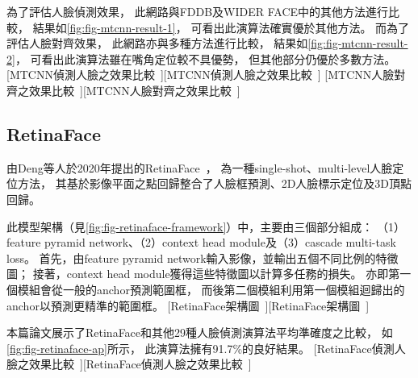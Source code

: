 \documentclass[class=NCU_thesis, crop=false]{standalone}
\begin{document}
為了評估人臉偵測效果，
此網路與FDDB及WIDER FACE中的其他方法進行比較，
結果如\cref{fig:fig-mtcnn-result-1}，
可看出此演算法確實優於其他方法。
而為了評估人臉對齊效果，
此網路亦與多種方法進行比較，
結果如\cref{fig:fig-mtcnn-result-2}，
可看出此演算法雖在嘴角定位較不具優勢，
但其他部分仍優於多數方法。
[MTCNN偵測人臉之效果比較~\cite{zhang_joint_2016}][MTCNN偵測人臉之效果比較~\cite{zhang_joint_2016}]
[MTCNN人臉對齊之效果比較~\cite{zhang_joint_2016}][MTCNN人臉對齊之效果比較~\cite{zhang_joint_2016}]

\subsection{RetinaFace}
由Deng等人於2020年提出的RetinaFace~\cite{deng_retinaface_2020}，
為一種single-shot、multi-level人臉定位方法，
其基於影像平面之點回歸整合了人臉框預測、2D人臉標示定位及3D頂點回歸。

此模型架構（見\cref{fig:fig-retinaface-framework}）中，主要由三個部分組成：
（1）feature pyramid network、（2）context head module及（3）cascade multi-task loss。
首先，由feature pyramid network輸入影像，並輸出五個不同比例的特徵圖；
接著，context head module獲得這些特徵圖以計算多任務的損失。
亦即第一個模組會從一般的anchor預測範圍框，
而後第二個模組利用第一個模組迴歸出的anchor以預測更精準的範圍框。
[RetinaFace架構圖~\cite{deng_retinaface_2020}][RetinaFace架構圖~\cite{deng_retinaface_2020}]

本篇論文展示了RetinaFace和其他29種人臉偵測演算法平均準確度之比較，
如\cref{fig:fig-retinaface-ap}所示，
此演算法擁有91.7\%的良好結果。
[RetinaFace偵測人臉之效果比較~\cite{deng_retinaface_2020}][RetinaFace偵測人臉之效果比較~\cite{deng_retinaface_2020}]
\end{document}

